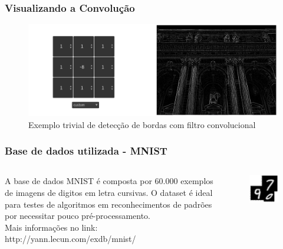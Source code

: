 \documentclass[tikz,10pt]{beamer}
\begin{document}
\begin{frame}
	\frametitle{Visualizando a Convolução}
	\centering
	\begin{figure}
		\centering
		\includegraphics[width=1.0\linewidth]{images/convolucao/006_edge_det}		
		\caption{Exemplo trivial de detecção de bordas com filtro convolucional}
		\label{fig:orig_blur}
	\end{figure}
	
\end{frame}


\begin{frame}
	\frametitle{Base de dados utilizada - MNIST}
	
	\begin{columns}
		\begin{column}{0.48\textwidth}
			A base de dados MNIST é composta por 60.000 exemplos de
			imagens de digitos em letra cursivas. O dataset é ideal para
			testes de algoritmos em reconhecimentos de padrões por
			necessitar pouco pré-processamento.\\
			Mais informações no link: http://yann.lecun.com/exdb/mnist/
		\end{column}
		\begin{column}{0.48\textwidth}
			\begin{figure}
				\centering
				\includegraphics[scale=0.35]{minst}
			\end{figure}
		\end{column}
	\end{columns}
	
	
\end{frame}
\end{document}
